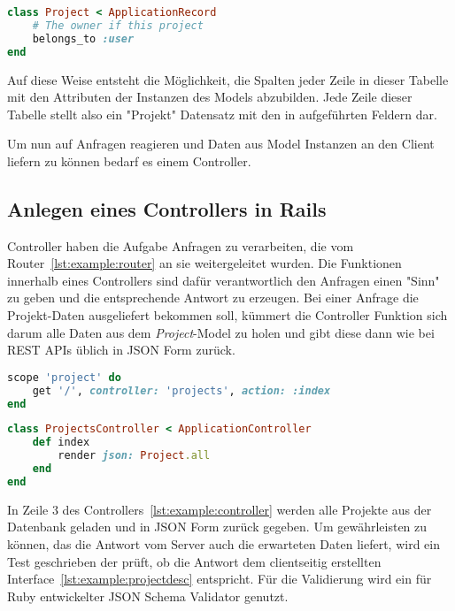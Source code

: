 \begin{lstlisting}[language=Ruby,float=h!,caption={Model}, label={lst:example:model}]
class Project < ApplicationRecord
	# The owner if this project
	belongs_to :user
end
\end{lstlisting}

Auf diese Weise entsteht die Möglichkeit, die Spalten jeder Zeile in dieser Tabelle mit den Attributen der Instanzen des Models abzubilden.
Jede Zeile dieser Tabelle stellt also ein "Projekt" Datensatz mit den in  aufgeführten Feldern dar.

Um nun auf Anfragen reagieren und Daten aus Model Instanzen an den Client liefern zu können bedarf es einem Controller.

\subsection{Anlegen eines Controllers in Rails}
\label{sec:requirements:example:controller}
Controller haben die Aufgabe Anfragen zu verarbeiten, die vom Router~\ref{lst:example:router} an sie weitergeleitet wurden.
Die Funktionen innerhalb eines Controllers sind dafür verantwortlich den Anfragen einen "Sinn" zu geben und die entsprechende Antwort zu erzeugen.
Bei einer Anfrage die Projekt-Daten ausgeliefert bekommen soll, kümmert die Controller Funktion sich darum alle Daten aus dem \emph{Project}-Model
zu holen und gibt diese dann wie bei REST APIs üblich in JSON Form zurück.

\begin{lstlisting}[language=Ruby,float=h!,caption={Route entspricht URL '/project/' und leitet Anfrage an die ProjectsController Funktion \emph{index} weiter }, label={lst:example:router}]
scope 'project' do
	get '/', controller: 'projects', action: :index
end
\end{lstlisting}

\begin{lstlisting}[language=Ruby,float=h!,caption={Controller mit Funktion zum zurückgeben aller Project Instanzen}, label={lst:example:controller}]
class ProjectsController < ApplicationController
	def index
		render json: Project.all
	end
end
\end{lstlisting}

In Zeile 3 des Controllers~\ref{lst:example:controller} werden alle Projekte aus der Datenbank geladen und in JSON Form
zurück gegeben. Um gewährleisten zu können, das die Antwort vom Server auch die erwarteten Daten liefert, wird ein
Test geschrieben der prüft, ob die Antwort dem clientseitig erstellten Interface~\ref{lst:example:projectdesc} entspricht.
Für die Validierung wird ein für Ruby entwickelter JSON Schema Validator genutzt.

